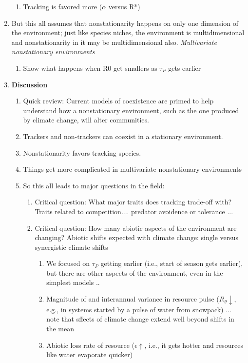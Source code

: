 \documentclass[11pt,letterpaper]{article}
\begin{document}
\begin{enumerate}
\begin{enumerate}
\item Tracking is favored more ($\alpha$ versus R*)
\end{enumerate}
\item But this all assumes that nonstationarity happens on only one dimension of the environment; just like species niches, the environment is multidimensional and nonstationarity in it may be multidimensional also. \emph{Multivariate nonstationary environments}
\begin{enumerate}
\item Show what happens when R0 get smallers as $\tau_{P}$ gets earlier
\end{enumerate}
\item {\bf Discussion}
\begin{enumerate}
\item Quick review: Current models of coexistence are primed to help understand how a nonstationary environment, such as the one produced by climate change, will alter communities. 
\item Trackers and non-trackers can coexist in a stationary environment. 
\item Nonstationarity favors tracking species. 
\item Things get more complicated in multivariate nonstationary environments
\item So this all leads to major questions in the field:
\begin{enumerate}
\item Critical question: What major traits does tracking trade-off with? Traits related to competition.... predator avoidence or tolerance ...
\item Critical question: How many abiotic aspects of the environment are changing? Abiotic shifts expected with climate change: single versus synergistic climate shifts
\begin{enumerate}
\item We focused on $\tau_{P}$ getting earlier (i.e., start of season gets earlier), but there are other aspects of the environment, even in the simplest models ..
\item Magnitude of and interannual variance in resource pulse ($R_{\theta} \downarrow$, e.g., in systems started by a pulse of water from snowpack) ... note that sffects of climate change extend well beyond shifts in the mean
\item Abiotic loss rate of resource ($\epsilon \uparrow$, i.e., it gets hotter and resources like water evaporate quicker)
\end{enumerate}
\end{enumerate}
\end{enumerate}
\end{enumerate}
\end{document}
